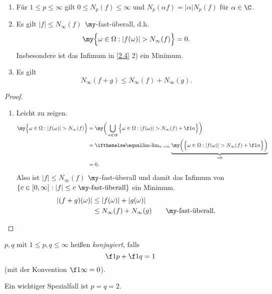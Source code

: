 \begin{st}[Eigenschaften] \label{2.5}
	\begin{enumerate}[1)]
		\item
			Für $1 \le p \le \infty$ gilt $0 \le N_p(f) \le \infty$ und $N_p(\alpha f) = |\alpha| N_p(f)$ für $\alpha \in \C$.
		\item
			Es gilt $|f| \le N_\infty(f)$ $\my$-fast-überall, d.h.
			\[
				\my \Big\{ \omega \in \Omega : |f(\omega)| > N_\infty(f) \Big\} = 0.
			\]
			Insbesondere ist das Infimum in \ref{2.4} 2) ein Minimum.
		\item
			Es gilt
			\[
				N_\infty(f+g) \le N_\infty (f) + N_\infty(g).
			\]
	\end{enumerate}
	\begin{proof}
		\begin{enumerate}[1)]
			\item Leicht zu zeigen.
			\itemdm
				\begin{align*}
					\my \Big\{ \omega \in \Omega : |f(\omega)| > N_\infty(f) \Big\}
					&= \my \bigg( \bigcup_{n\in \N} \Big\{ \omega \in \Omega : |f(\omega)| > N_\infty(f) + \f 1n \Big\} \bigg) \\
					&= \lim_{n\to \infty }\underbrace{\my \bigg( \Big\{ \omega \in \Omega : |f(\omega)| > N_\infty(f) + \f 1n \Big\} \bigg)}_{=0} \\
					&=  0.
				\end{align*}
				Also ist $|f| \le N_\infty(f)$ $\my$-fast-überall und damit das Infimum von $\{c \in [0,\infty] : |f| \le c \text{ $\my$-fast-überall}\}$ ein Minimum.
			\itemdm
				\begin{align*}
					|(f+g)(\omega)|
					& \le |f(\omega)| + |g(\omega)| \\
					& \le N_\infty(f) + N_\infty(g) \qquad \text{$\my$-fast-überall.}
				\end{align*}
		\end{enumerate}
	\end{proof}
\end{st}

\begin{df} \label{2.6}
	$p,q$ mit $1 \le p,q \le \infty$ heißen \emph{konjugiert}, falls
	\[
		\f 1p + \f 1q = 1
	\]
	(mit der Konvention $\f 1\infty = 0$).
	\begin{note}
		Ein wichtiger Spezialfall ist $p=q=2$.
	\end{note}
\end{df}


